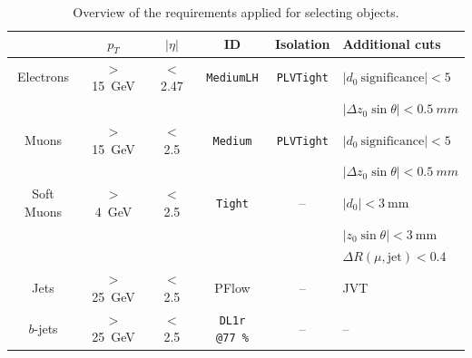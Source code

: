 \begin{table}[!h]
	\scriptsize
	\centering
	\begin{tabular}{cccccl}
		\toprule
		& $p_{T}$ & $|\eta|$ & ID & Isolation & Additional cuts \\
		\midrule
		Electrons & $>$ \SI{15}{\GeV} & $<$ 2.47 & \texttt{MediumLH} & \texttt{PLVTight}  & $|d_0~\mathrm{significance} | < 5$ \\
		& & & & & $|\Delta z_0\sin\theta| < \SI{0.5}{mm}$ \\
		\midrule
		Muons & $>$ \SI{15}{\GeV} & $<$ 2.5 & \texttt{Medium} & \texttt{PLVTight}  & $|d_0~\mathrm{significance} | < 5$ \\
		& & & & & $|\Delta z_0 \sin\theta| < \SI{0.5}{mm}$ \\
		\midrule
		Soft Muons & $>$ \SI{4}{\GeV} & $<$ 2.5 & \texttt{Tight} & -- & $|d_0| < \SI{3}{\milli\metre}$ \\
		& & & & & $|z_0 \sin\theta| < \SI{3}{\milli\metre}$ \\
		& & & & & $\Delta R(\mu,\mathrm{jet}) < 0.4$ \\
		\midrule
		Jets & $>$ \SI{25}{\GeV} & $<$ 2.5 & PFlow & --  & JVT \\
		\midrule
		$b$-jets & $>$ \SI{25}{\GeV} & $<$ 2.5 & \texttt{DL1r @\SI{77}{\%}} & --  & --\\
		\bottomrule
	\end{tabular}
	\caption{\normalsize{Overview of the requirements applied for selecting objects.}}
	\label{tab:objects}
\end{table}


\FloatBarrier
